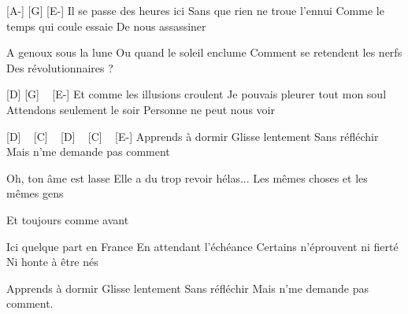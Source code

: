 [A-] [G] [E-]
Il se passe des heures ici
Sans que rien ne troue l'ennui
Comme le temps qui coule essaie
De nous assassiner

A genoux sous la lune
Ou quand le soleil enclume
Comment se retendent les nerfs
Des révolutionnaires ?

[D] [G] ~ [E-]
Et comme les illusions croulent
Je pouvais pleurer tout mon soul
Attendons seulement le soir
Personne ne peut nous voir

[D] ~ [C] ~ [D] ~ [C] ~ [E-]
Apprends à dormir
Glisse lentement
Sans réfléchir
Mais n'me demande pas comment

Oh, ton âme est lasse
Elle a du trop revoir hélas...
Les mêmes choses et les mêmes gens

Et toujours comme avant

Ici quelque part en France
En attendant l'échéance
Certains n'éprouvent ni fierté
Ni honte à être nés

Apprends à dormir
Glisse lentement
Sans réfléchir
Mais n'me demande pas comment.

